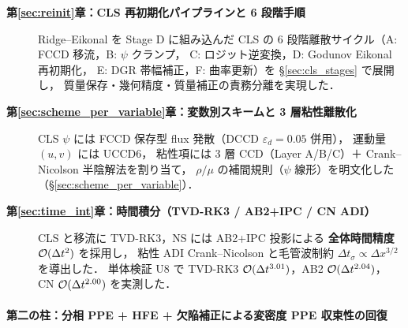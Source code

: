 \begin{description}
  \item[\textbf{第\ref{sec:reinit}章：CLS 再初期化パイプラインと 6 段階手順}]
        Ridge--Eikonal を Stage D に組み込んだ
        CLS の 6 段階離散サイクル（A: FCCD 移流，B: $\psi$ クランプ，
        C: ロジット逆変換，D: Godunov Eikonal 再初期化，
        E: DGR 帯幅補正，F: 曲率更新）を §\ref{sec:cls_stages} で展開し，
        質量保存・幾何精度・質量補正の責務分離を実現した．

  \item[\textbf{第\ref{sec:scheme_per_variable}章：変数別スキームと 3 層粘性離散化}]
        CLS $\psi$ には FCCD 保存型 flux 発散（DCCD $\varepsilon_d=0.05$ 併用），
        運動量 $(u,v)$ には UCCD6，
        粘性項には 3 層 CCD（Layer A/B/C）＋ Crank--Nicolson 半陰解法を割り当て，
        $\rho/\mu$ の補間規則（$\psi$ 線形）を明文化した（§\ref{sec:scheme_per_variable}）．

  \item[\textbf{第\ref{sec:time_int}章：時間積分（TVD-RK3 / AB2+IPC / CN ADI）}]
        CLS と移流に TVD-RK3，NS には AB2+IPC 投影による
        \textbf{全体時間精度 $\mathcal{O}(\Delta t^2)$} を採用し，
        粘性 ADI Crank--Nicolson と毛管波制約 $\Delta t_\sigma \propto \Delta x^{3/2}$ を導出した．
        単体検証 U8 で TVD-RK3 $\mathcal{O}(\Delta t^{3.01})$，AB2 $\mathcal{O}(\Delta t^{2.04})$，
        CN $\mathcal{O}(\Delta t^{2.00})$ を実測した．
\end{description}

\paragraph{第二の柱：分相 PPE + HFE + 欠陥補正による変密度 PPE 収束性の回復}\hfill\null

